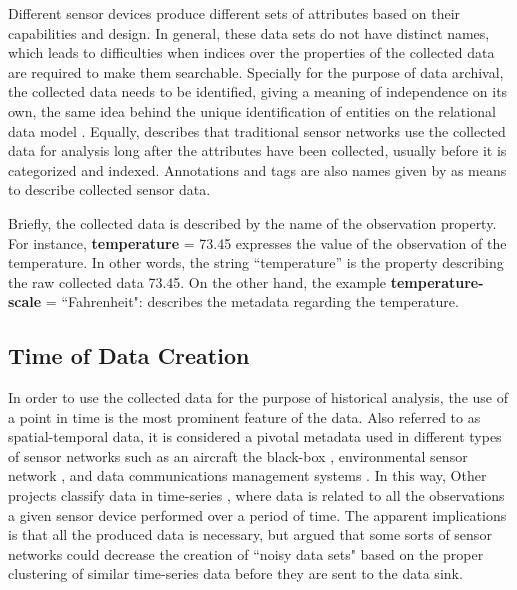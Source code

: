 Different sensor devices produce different sets of attributes based on their
capabilities and design. In general, these data sets do not have distinct
names, which leads to difficulties when indices over the properties of the
collected data are required to make them searchable. Specially for the purpose
of data archival, the collected data needs to be identified, giving a meaning
of independence on its own, the same idea behind the unique identification of
entities on the relational data model \cite{relational-model}. Equally,
\cite{sn-provenance} describes that traditional sensor networks use the
collected data for analysis long after the attributes have been collected,
usually before it is categorized and indexed. Annotations and tags are also
names given by \cite{sn-provenance} as means to describe collected sensor data.

Briefly, the collected data is described by the name of the observation
property. For instance, \textbf{temperature} = 73.45 expresses the value of the
observation of the temperature. In other words, the string ``temperature'' is
the property describing the raw collected data 73.45. On the other hand,
the example \textbf{temperature-scale} = ``Fahrenheit": describes the metadata
regarding the temperature.

\subsection{Time of Data Creation}

In order to use the collected data for the purpose of historical analysis, the
use of a point in time is the most prominent feature of the data. Also referred to
as spatial-temporal data, it is considered a pivotal metadata used in different
types of sensor networks such as an aircraft the black-box
\cite{sn-exemple-blackbox}, environmental sensor network \cite{sfbeams2006},
and data communications management systems \cite{sn-dataware-house}. In this
way, Other projects classify data in time-series \cite{sn-time-series-example},
where data is related to all the observations a given sensor device performed
over a period of time. The apparent implications is that all the produced data
is necessary, but \cite{sn-time-series} argued that some sorts of sensor
networks could decrease the creation of ``noisy data sets" based on the proper
clustering of similar time-series data before they are sent to the data
sink.


